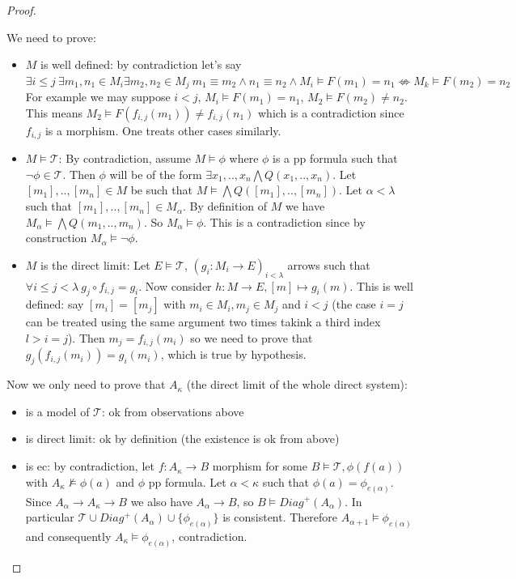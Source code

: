 \documentclass{article}
\begin{document}
\begin{proof}
\begin{itemize}
	\end{itemize}

	We need to prove:
	\begin{itemize}
		\item	$M$ is well defined: 
			by contradiction let's say 
			$\exists i \leq j \ \exists m_1,n_1 \in M_i \exists m_2,n_2 \in M_j \ 
			m_1 \equiv m_2 \land n_1 \equiv n_2 \land M_i \models F(m_1) = n_1 \not \iff M_k \models F(m_2) = n_2$
			For example we may suppose $i < j$, $M_i \models F(m_1) = n_1$, $M_2 \models F(m_2) \not = n_2$.
			This means $M_2 \models F(f_{i,j}(m_1)) \not = f_{i,j}(n_1)$ which is a contradiction since $f_{i,j}$ is a morphism.
			One treats other cases similarly.

		\item	$M \models \mathcal{T}$:
			By contradiction, assume $M \models \phi$ where $\phi$ is a pp formula such that $\neg \phi \in \mathcal{T}$.
			Then $\phi$ will be of the form $\exists x_1,..,x_n \bigwedge Q(x_1,..,x_n)$.
			Let $[m_1],..,[m_n] \in M$ be such that $M \models \bigwedge Q([m_1],..,[m_n])$.
			Let $\alpha < \lambda$ such that $[m_1],..,[m_n] \in M_{\alpha}$.
			By definition of $M$ we have $M_{\alpha} \models \bigwedge Q(m_1,..,m_n)$.
			So $M_{\alpha} \models \phi$. This is a contradiction since by construction $M_{\alpha} \models \neg \phi$.

		\item	$M$ is the direct limit:
			Let $E \models \mathcal{T}$, $(g_i: M_i \to E)_{i < \lambda}$ arrows such that $\forall i \leq j < \lambda \ g_j \circ f_{i,j} = g_i$. 
			Now consider $h: M \to E, [m] \mapsto g_i(m)$. This is well defined:
			say $[m_i] = [m_j]$ with $m_i \in M_i, m_j \in M_j$ and $i < j$ (the case $i = j$ can be treated using the same argument two times takink a third index $l > i = j$).
			Then $m_j = f_{i,j}(m_i)$ so we need to prove that $g_j(f_{i,j}(m_i)) = g_i(m_i)$, which is true by hypothesis.

	\end{itemize}

	Now we only need to prove that $A_{\kappa}$ (the direct limit of the whole direct system):
	\begin{itemize}
		\item	is a model of $\mathcal{T}$: ok from observations above
		\item	is direct limit: ok by definition (the existence is ok from above)
		\item	is ec:
			by contradiction, let $f: A_{\kappa} \to B$ morphism for some $B \models \mathcal{T}, \phi(f(a))$ with $A_{\kappa} \not \models \phi(a)$ and $\phi$ pp formula.
			Let $\alpha < \kappa$ such that $\phi(a) = \phi_{e(\alpha)}$.
			Since $A_{\alpha} \to A_{\kappa} \to B$ we also have $A_{\alpha} \to B$, so $B \models Diag^+(A_{\alpha})$.
			In particular $\mathcal{T} \cup Diag^+(A_{\alpha}) \cup \{\phi_{e(\alpha)}\}$ is consistent.
			Therefore $A_{\alpha +1} \models \phi_{e(\alpha)}$ and consequently $A_{\kappa} \models \phi_{e(\alpha)}$, contradiction.
	\end{itemize}

\end{proof}
\end{document}
